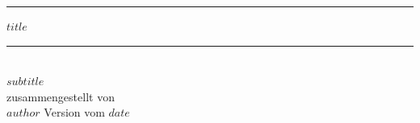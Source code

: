 \begin{titlepage}
\begin{center}
\noindent\rule[1ex]{\textwidth}{0.5pt}
 \Huge \textbf{$title$}\\[4mm]
\end{center}
\noindent\rule[1ex]{\textwidth}{0.5pt}
 \normalsize
\vfill

{\centering
 \\
\vfill
\Large $subtitle$ \\[10mm]
\normalsize zusammengestellt von\\   $author$
\vfill
\scriptsize Version vom $date$\normalsize

}
\thispagestyle{empty}
\end{titlepage}
